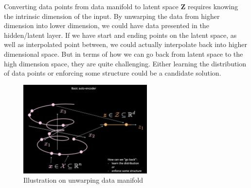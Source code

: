 Converting data points from data manifold to latent space \textbf{Z} requires knowing the intrinsic dimension of the input. By unwarping the data from higher dimension into lower dimension, we could have data presented in the hidden/latent layer. If we have start and ending points on the latent space, as well as interpolated point between, we could actually interpolate back into higher dimensional space. But in terms of how we can go back from latent space to the high dimension space, they are quite challenging. Either learning the distribution of data points or enforcing some structure could be a candidate solution.
\\
\begin{figure}[htb]
    \centering
    \includegraphics[width=0.6\textwidth]{labs/10/images/Data_manifold.png}
    \caption{Illustration on unwarping data manifold}
    \label{fig:Data_manifold}
\end{figure}
\\





